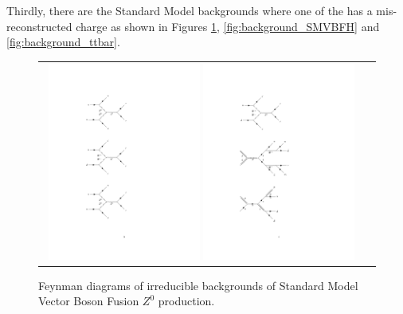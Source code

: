 Thirdly, there are the Standard Model backgrounds where one of the \hadtau has a mis-reconstructed charge as shown in Figures \ref{fig:background_SMVBFZ0}, \ref{fig:background_SMVBFH} and \ref{fig:background_ttbar}. 

\begin{figure}[tbh!]
	\centering
	\begin{tabular}{cc}
		\includegraphics[width=0.48\textwidth]{diagrams/pics/background_SMVBFZ0Z0.pdf}
		\includegraphics[width=0.48\textwidth]{diagrams/pics/background_SMVBFZ0W.pdf} 		
	\end{tabular}
	\caption{Feynman diagrams of irreducible backgrounds of Standard Model Vector Boson Fusion $Z^{0}$ production. }
	\label{fig:background_SMVBFZ0}
\end{figure}

